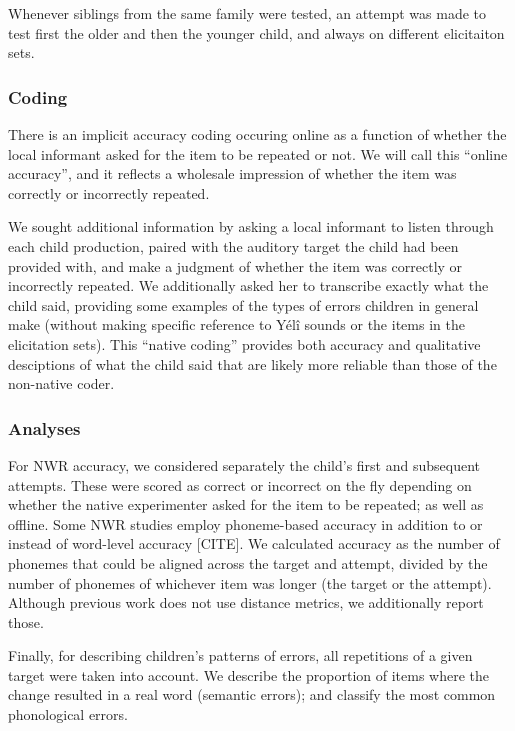 \documentclass[english,,man,floatsintext]{apa6}
\begin{document}
Whenever siblings from the same family were tested, an attempt was made to test first the older and then the younger child, and always on different elicitaiton sets.

\hypertarget{coding}{%
\subsubsection{Coding}\label{coding}}

There is an implicit accuracy coding occuring online as a function of whether the local informant asked for the item to be repeated or not. We will call this \enquote{online accuracy}, and it reflects a wholesale impression of whether the item was correctly or incorrectly repeated.

We sought additional information by asking a local informant to listen through each child production, paired with the auditory target the child had been provided with, and make a judgment of whether the item was correctly or incorrectly repeated. We additionally asked her to transcribe exactly what the child said, providing some examples of the types of errors children in general make (without making specific reference to Yélî sounds or the items in the elicitation sets). This \enquote{native coding} provides both accuracy and qualitative desciptions of what the child said that are likely more reliable than those of the non-native coder.

\hypertarget{analyses}{%
\subsubsection{Analyses}\label{analyses}}

For NWR accuracy, we considered separately the child's first and subsequent attempts. These were scored as correct or incorrect on the fly depending on whether the native experimenter asked for the item to be repeated; as well as offline. Some NWR studies employ phoneme-based accuracy in addition to or instead of word-level accuracy {[}CITE{]}. We calculated accuracy as the number of phonemes that could be aligned across the target and attempt, divided by the number of phonemes of whichever item was longer (the target or the attempt). Although previous work does not use distance metrics, we additionally report those.

Finally, for describing children's patterns of errors, all repetitions of a given target were taken into account. We describe the proportion of items where the change resulted in a real word (semantic errors); and classify the most common phonological errors.
\end{document}

